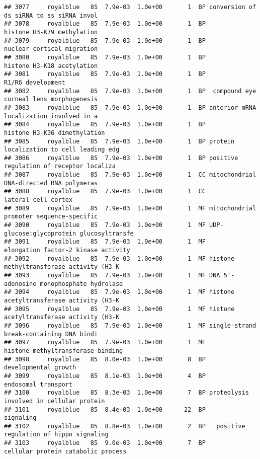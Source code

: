 \documentclass[]{article}
\begin{document}
\begin{verbatim}
## 3077     royalblue   85  7.9e-03  1.0e+00       1  BP conversion of ds siRNA to ss siRNA invol
## 3078     royalblue   85  7.9e-03  1.0e+00       1  BP               histone H3-K79 methylation
## 3079     royalblue   85  7.9e-03  1.0e+00       1  BP               nuclear cortical migration
## 3080     royalblue   85  7.9e-03  1.0e+00       1  BP               histone H3-K18 acetylation
## 3081     royalblue   85  7.9e-03  1.0e+00       1  BP                        R1/R6 development
## 3082     royalblue   85  7.9e-03  1.0e+00       1  BP  compound eye corneal lens morphogenesis
## 3083     royalblue   85  7.9e-03  1.0e+00       1  BP anterior mRNA localization involved in a
## 3084     royalblue   85  7.9e-03  1.0e+00       1  BP             histone H3-K36 dimethylation
## 3085     royalblue   85  7.9e-03  1.0e+00       1  BP protein localization to cell leading edg
## 3086     royalblue   85  7.9e-03  1.0e+00       1  BP positive regulation of receptor localiza
## 3087     royalblue   85  7.9e-03  1.0e+00       1  CC mitochondrial DNA-directed RNA polymeras
## 3088     royalblue   85  7.9e-03  1.0e+00       1  CC                      lateral cell cortex
## 3089     royalblue   85  7.9e-03  1.0e+00       1  MF mitochondrial promoter sequence-specific
## 3090     royalblue   85  7.9e-03  1.0e+00       1  MF UDP-glucose:glycoprotein glucosyltransfe
## 3091     royalblue   85  7.9e-03  1.0e+00       1  MF      elongation factor-2 kinase activity
## 3092     royalblue   85  7.9e-03  1.0e+00       1  MF histone methyltransferase activity (H3-K
## 3093     royalblue   85  7.9e-03  1.0e+00       1  MF DNA 5'-adenosine monophosphate hydrolase
## 3094     royalblue   85  7.9e-03  1.0e+00       1  MF histone acetyltransferase activity (H3-K
## 3095     royalblue   85  7.9e-03  1.0e+00       1  MF histone acetyltransferase activity (H3-K
## 3096     royalblue   85  7.9e-03  1.0e+00       1  MF single-strand break-containing DNA bindi
## 3097     royalblue   85  7.9e-03  1.0e+00       1  MF        histone methyltransferase binding
## 3098     royalblue   85  8.0e-03  1.0e+00       8  BP                     developmental growth
## 3099     royalblue   85  8.1e-03  1.0e+00       4  BP                      endosomal transport
## 3100     royalblue   85  8.3e-03  1.0e+00       7  BP proteolysis involved in cellular protein
## 3101     royalblue   85  8.4e-03  1.0e+00      22  BP                                signaling
## 3102     royalblue   85  8.8e-03  1.0e+00       2  BP   positive regulation of hippo signaling
## 3103     royalblue   85  9.0e-03  1.0e+00       7  BP       cellular protein catabolic process

\end{verbatim}
\end{document}
